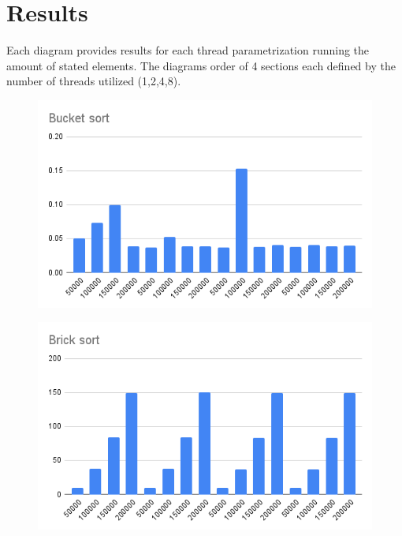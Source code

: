 \chapter{Results}

Each diagram provides results for each thread parametrization running the amount of stated elements.
The diagrams order of 4 sections each defined by the number of threads utilized (1,2,4,8).

\begin{minipage}{0.5\textwidth}
    \begin{figure}[H]
        \centering
        \includegraphics[width=1.0\textwidth]{graphics/Bucket_sort.png}
        \label{fig:Matrix_multiplication}
    \end{figure}
\end{minipage}
\begin{minipage}{0.5\textwidth}
    \begin{figure}[H]
        \centering
        \includegraphics[width=1.0\textwidth]{graphics/Brick_sort.png}
    \end{figure}
\end{minipage}
